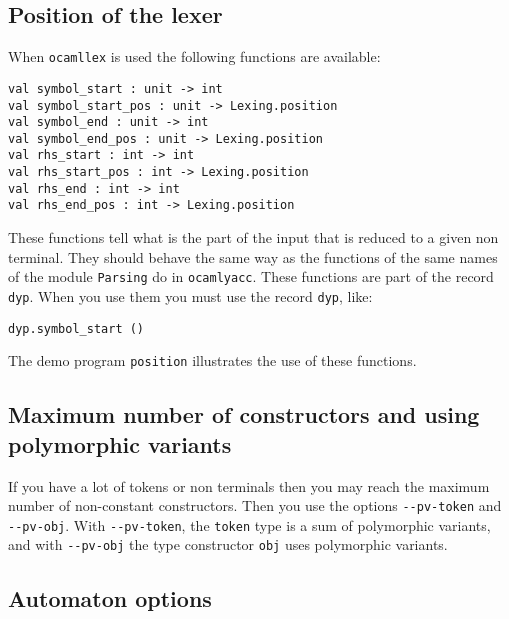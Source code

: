 \documentclass[12pt]{article}
\begin{document}
{\subsection{Position of the lexer}

When \texttt{ocamllex} is used the following functions are available:
\begin{verbatim}
val symbol_start : unit -> int
val symbol_start_pos : unit -> Lexing.position
val symbol_end : unit -> int
val symbol_end_pos : unit -> Lexing.position
val rhs_start : int -> int
val rhs_start_pos : int -> Lexing.position
val rhs_end : int -> int
val rhs_end_pos : int -> Lexing.position
\end{verbatim}
These functions tell what is the part of the input that is reduced to a given non terminal. They should behave the same way as the functions of the same names of the module \texttt{Parsing} do in \texttt{ocamlyacc}.
These functions are part of the record \verb|dyp|. When you use them you must use the record \verb|dyp|, like:
\begin{verbatim}
dyp.symbol_start ()
\end{verbatim}

The demo program \texttt{position} illustrates the use of these functions.

\subsection{Maximum number of constructors and using polymorphic variants}

If you have a lot of tokens or non terminals then you may reach the maximum number of non-constant constructors. Then you use the options \verb|--pv-token| and \verb|--pv-obj|. With \verb|--pv-token|, the \verb|token| type is a sum of polymorphic variants, and with \verb|--pv-obj| the type constructor \verb|obj| uses polymorphic variants.

\subsection{Automaton options}


}
\end{document}
